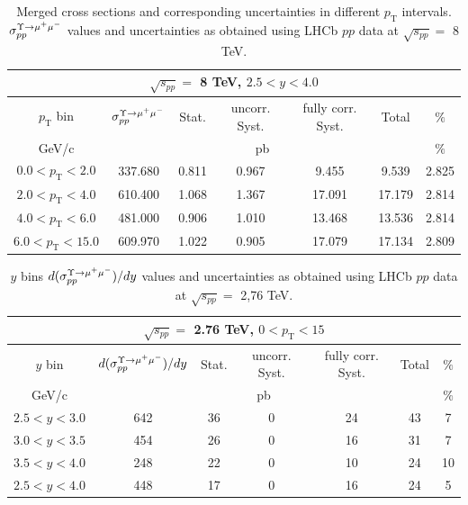 \begin{table}[htp]
\begin{center}
\begin{tabular}{|c||c|c|c|c|c|c|}
  \hline
  \multicolumn{7}{|c|}{$\sqrt{s_{pp}}=$ 8 TeV, $2.5<y<4.0$}\\
  \hline
  $p_\mathrm{T}$ bin & $\sigma_{pp}^{\Upsilon\rightarrow \mu^{+}\mu^{\--}} $ & Stat. & uncorr. Syst. & fully corr. Syst. & Total & $\%$ \\
  \hline
  GeV/c & \multicolumn{5}{c|}{pb} & $\%$ \\
  \hline
  $0.0 < p_\mathrm{T} < 2.0 $ & 337.680 & 0.811 & 0.967 & 9.455 & 9.539 & 2.825 \\
  \hline
  $2.0 < p_\mathrm{T} < 4.0 $& 610.400 & 1.068 & 1.367 & 17.091 & 17.179 & 2.814 \\
  \hline
  $4.0 < p_\mathrm{T} < 6.0 $& 481.000 & 0.906 & 1.010 & 13.468 & 13.536 & 2.814 \\
  \hline
  $6.0 < p_\mathrm{T} < 15.0 $& 609.970 & 1.022 & 0.905 & 17.079 & 17.134 & 2.809 \\
  \hline
\end{tabular}
\caption{Merged cross sections and corresponding uncertainties in different $p_\mathrm{T}$ intervals. $\sigma_{pp}^{\Upsilon\rightarrow \mu^{+}\mu^{\--}} $ values and uncertainties as obtained using LHCb $pp$ data at $\sqrt{s_{pp}}=$ 8 TeV.}\label{table:LHCbData8}
\end{center}
\end{table}

\begin{table}[!tp]
\begin{center}
\begin{tabular}{|c||c|c|c|c|c|c|}
  \hline
  \multicolumn{7}{|c|}{$\sqrt{s_{pp}}=$ 2.76 TeV, $0<p_\mathrm{T}<15$}\\
  \hline
  $y$ bin & $d(\sigma_{pp}^{\Upsilon\rightarrow \mu^{+}\mu^{\--}})/dy $ & Stat. & uncorr. Syst. & fully corr. Syst. & Total & $\%$ \\
  \hline
  GeV/c & \multicolumn{5}{c|}{pb} & $\%$ \\
  \hline
  $2.5 < y < 3.0 $ & 642 & 36 & 0 & 24 & 43 & 7 \\
  \hline
  $3.0 < y < 3.5 $& 454 & 26 & 0 & 16 & 31 & 7 \\
  \hline
  $3.5 < y < 4.0 $& 248 & 22 & 0 & 10 & 24 & 10 \\
  \hline
  $2.5 < y < 4.0 $& 448 & 17 & 0 & 16 & 24 & 5 \\
  \hline
\end{tabular}
\caption{$y$ bins $d(\sigma_{pp}^{\Upsilon\rightarrow \mu^{+}\mu^{\--}})/dy $ values and uncertainties as obtained using LHCb $pp$ data at $\sqrt{s_{pp}}=$ 2,76 TeV.}\label{table:LHCbY1sData276}
\end{center}
\end{table}

